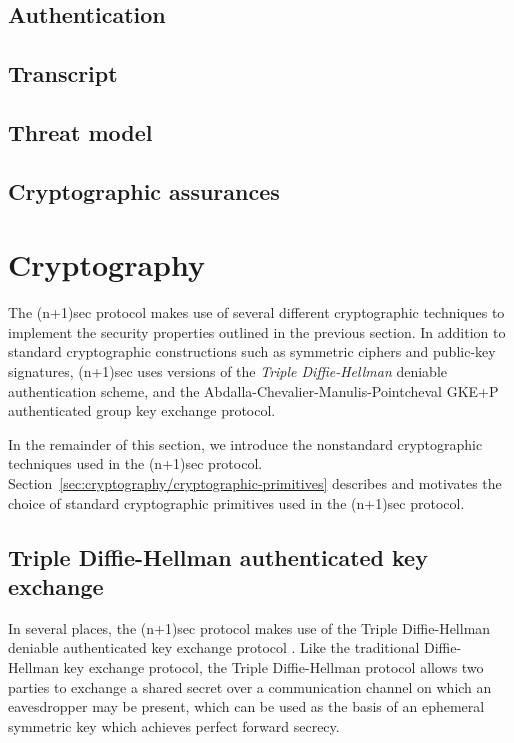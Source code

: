 \documentclass{article}
\begin{document}
\subsection{Authentication}


\subsection{Transcript}


\subsection{Threat model}


\subsection{Cryptographic assurances}



\section{Cryptography}
\label{sec:cryptography}

The (n+1)sec protocol makes use of several different cryptographic techniques to implement the security properties outlined in the previous section.
In addition to standard cryptographic constructions such as symmetric ciphers and public-key signatures, (n+1)sec uses versions of the \emph{Triple Diffie-Hellman} deniable authentication scheme, and the Abdalla-Chevalier-Manulis-Pointcheval GKE+P authenticated group key exchange protocol.

In the remainder of this section, we introduce the nonstandard cryptographic techniques used in the (n+1)sec protocol.
Section~\ref{sec:cryptography/cryptographic-primitives} describes and motivates the choice of standard cryptographic primitives used in the (n+1)sec protocol.


\subsection{Triple Diffie-Hellman authenticated key exchange}
\label{sec:cryptography/triple-diffie-hellman}

In several places, the (n+1)sec protocol makes use of the Triple Diffie-Hellman deniable authenticated key exchange protocol \cite{tdh}.
Like the traditional Diffie-Hellman key exchange protocol, the Triple Diffie-Hellman protocol allows two parties to exchange a shared secret over a communication channel on which an eavesdropper may be present, which can be used as the basis of an ephemeral symmetric key which achieves perfect forward secrecy.
\end{document}
